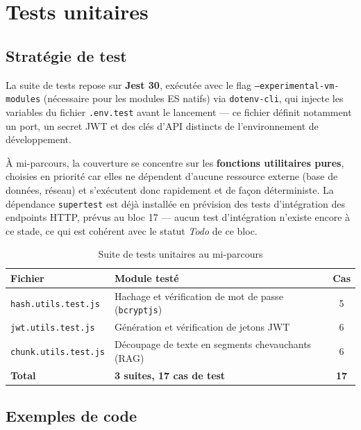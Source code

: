 \documentclass[12pt, a4paper]{article}
\begin{document}
\section{Tests unitaires}

\subsection{Stratégie de test}

La suite de tests repose sur \textbf{Jest 30}, exécutée avec le flag \texttt{--experimental-vm-modules} (nécessaire pour les modules ES natifs) via \texttt{dotenv-cli}, qui injecte les variables du fichier \texttt{.env.test} avant le lancement — ce fichier définit notamment un port, un secret JWT et des clés d'API distincts de l'environnement de développement.

À mi-parcours, la couverture se concentre sur les \textbf{fonctions utilitaires pures}, choisies en priorité car elles ne dépendent d'aucune ressource externe (base de données, réseau) et s'exécutent donc rapidement et de façon déterministe. La dépendance \texttt{supertest} est déjà installée en prévision des tests d'intégration des endpoints HTTP, prévus au bloc 17 — aucun test d'intégration n'existe encore à ce stade, ce qui est cohérent avec le statut \textit{Todo} de ce bloc.

\begin{table}[H]
\centering
\caption{Suite de tests unitaires au mi-parcours}
\label{tab:tests}
\begin{tabularx}{\textwidth}{lXc}
\toprule
\textbf{Fichier} & \textbf{Module testé} & \textbf{Cas} \\
\midrule
\texttt{hash.utils.test.js} & Hachage et vérification de mot de passe (\texttt{bcryptjs}) & 5 \\
\texttt{jwt.utils.test.js}  & Génération et vérification de jetons JWT & 6 \\
\texttt{chunk.utils.test.js} & Découpage de texte en segments chevauchants (RAG) & 6 \\
\midrule
\textbf{Total} & \textbf{3 suites, 17 cas de test} & \textbf{17} \\
\bottomrule
\end{tabularx}
\end{table}

\subsection{Exemples de code}
\end{document}
